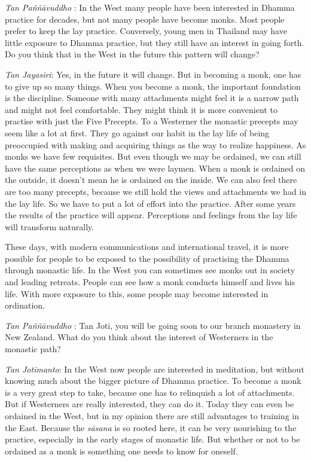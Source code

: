 \emph{Tan Paññāvuddho} : In the West many people have been interested in
Dhamma practice for decades, but not many people have become monks. Most
people prefer to keep the lay practice. Conversely, young men in
Thailand may have little exposure to Dhamma practice, but they still
have an interest in going forth. Do you think that in the West in the
future this pattern will change?

\emph{Tan Jayasiri}: Yes, in the future it will change. But in becoming
a monk, one has to give up so many things. When you become a monk, the
important foundation is the discipline. Someone with many attachments
might feel it is a narrow path and might not feel comfortable. They
might think it is more convenient to practise with just the Five
Precepts. To a Westerner the monastic precepts may seem like a lot at
first. They go against our habit in the lay life of being preoccupied
with making and acquiring things as the way to realize happiness. As
monks we have few requisites. But even though we may be ordained, we can
still have the same perceptions as when we were laymen. When a monk is
ordained on the outside, it doesn't mean he is ordained on the inside.
We can also feel there are too many precepts, because we still hold the
views and attachments we had in the lay life. So we have to put a lot of
effort into the practice. After some years the results of the practice
will appear. Perceptions and feelings from the lay life will transform
naturally.

These days, with modern communications and international travel, it is
more possible for people to be exposed to the possibility of practising
the Dhamma through monastic life. In the West you can sometimes see
monks out in society and leading retreats. People can see how a monk
conducts himself and lives his life. With more exposure to this, some
people may become interested in ordination.

\emph{Tan Paññāvuddho} : Tan Joti, you will be going soon to our branch
monastery in New Zealand. What do you think about the interest of
Westerners in the monastic path?

\emph{Tan Jotimanto}: In the West now people are interested in
meditation, but without knowing much about the bigger picture of Dhamma
practice. To become a monk is a very great step to take, because one has
to relinquish a lot of attachments. But if Westerners are really
interested, they can do it. Today they can even be ordained in the West,
but in my opinion there are still advantages to training in the East.
Because the \emph{sāsana} is so rooted here, it can be very nourishing
to the practice, especially in the early stages of monastic life. But
whether or not to be ordained as a monk is something one needs to know
for oneself.

